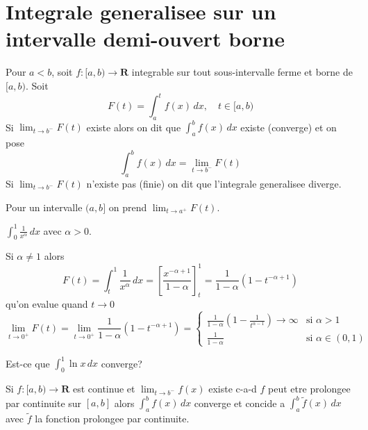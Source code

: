 \section{Integrale generalisee sur un intervalle demi-ouvert  borne}
\begin{definition}
Pour $a<b$, soit $f:[a,b)\to \mathbf{R}$ integrable sur tout sous-intervalle ferme et borne de $[a,b)$. Soit
$$
F(t)=\int_{a}^{t} f(x) \, dx, \quad t\in [a,b)
$$
Si $\lim_{ t \to b^{-} }F(t)$ existe alors on dit que $\int_{a}^{b} f(x) \, dx$ existe (converge) et on pose 
$$
\int_{a}^{b} f(x) \, dx=\lim_{ t \to b^{-} } F(t)
$$
Si $\lim_{ t \to b^{-} }F(t)$ n'existe pas (finie) on dit que l'integrale generalisee diverge.
\end{definition}
\begin{remark}
Pour un intervalle $(a,b]$ on prend $\lim_{ t \to a^{+} }F(t)$.
\end{remark}
\begin{example}[Important!]
$\int_{0}^{1} \frac{1}{x^{\alpha}}  \, dx$ avec $\alpha>0$.

Si $\alpha\neq 1$ alors $$F(t)=\int_{t}^{1} \frac{1}{x^{\alpha}} \, dx=\left[ \frac{x^{-\alpha+1}}{1-\alpha} \right]^{1}_{t}=\frac{1}{1-\alpha}(1-t^{-\alpha+1})$$
qu'on evalue quand $t\to0$
$$
\lim_{ t \to 0^{+} } F(t)=\lim_{ t \to 0^{+} } \frac{1}{1-\alpha}(1-t^{-\alpha+1})=\begin{cases}
\frac{1}{1-\alpha}\left( 1-\frac{1}{t^{\alpha-1}} \right)\to \infty & \text{si }\alpha>1 \\
\frac{1}{1-\alpha} & \text{si } \alpha \in(0,1)
\end{cases}
$$
\end{example}
\begin{exercise}
Est-ce que $\int_{0}^{1} \ln x \, dx$ converge?
\end{exercise}
\begin{remark}
Si $f:[a,b)\to \mathbf{R}$ est continue et $\lim_{ t \to b^{-} }f(x)$ existe c-a-d $f$ peut etre prolongee par continuite sur $[a,b]$ alors $\int_{a}^{b} f(x) \, dx$ converge et concide a $\int_{a}^{b} \tilde{f}(x) \, dx$ avec $\tilde{f}$ la fonction prolongee par continuite.
\end{remark}


